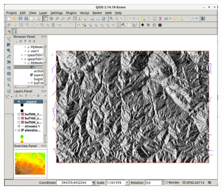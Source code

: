 \begin{figure}[htbp]
   \centering
   \includegraphics[scale=0.2]{qgis044.png}
   \caption{}
   \label{fig:qgis044}
\end{figure}

\address{GRASS Development Team\\
  \url{http://grass.osgeo.org}\\
  }


